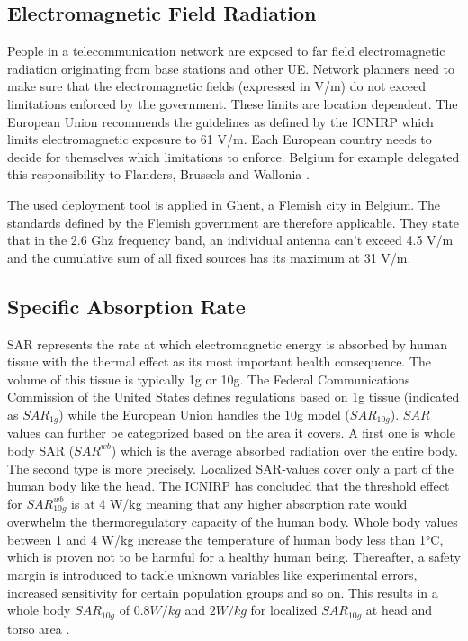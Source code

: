 \subsection{Electromagnetic Field Radiation} %
\label{sub:emf}
People in a telecommunication network are exposed to far field electromagnetic radiation originating from base stations and other \gls{UE}. 
Network planners need to make sure that the electromagnetic fields (expressed in V/m) do not exceed limitations enforced 
by the government. These limits are location dependent. The European Union recommends the guidelines as defined by the \gls{ICNIRP} which limits electromagnetic exposure to 61 V/m.
Each European country needs to decide for themselves which limitations to enforce. Belgium for example delegated this responsibility to Flanders, Brussels and Wallonia \cite{J23}.

The used deployment tool is applied in Ghent, a Flemish city in Belgium. The standards defined by the Flemish government are therefore applicable.
They state that in the 2.6 Ghz frequency band, an individual antenna can't exceed 4.5 V/m and the cumulative sum of all fixed sources has its maximum at 31 V/m.

\subsection{Specific Absorption Rate}
\gls{SAR} represents the rate at which electromagnetic energy is absorbed by human tissue with the thermal effect as its most important health consequence.
The volume of this tissue is typically 1g or 10g. The Federal Communications Commission of the United States defines regulations based on 1g tissue (indicated as $SAR_{1g}$) 
while the European Union handles the 
10g model ($SAR_{10g}$). $SAR$ values can further be categorized based on the area it covers. 
A first one is whole body \gls{SAR} ($SAR^{wb}$) which is the average absorbed radiation over the entire 
body. The second type is more precisely. Localized \gls{SAR}-values cover only  a part of the human body like the head.
The \gls{ICNIRP} has concluded that the threshold effect for $SAR^{wb}_{10g}$ is at 4 W/kg meaning that any higher absorption rate would overwhelm the \gls{thermoregulatory capacity} of the human body.
Whole body values between 1 and 4 W/kg increase the temperature of human body less than 1°C, which is proven not to be harmful for a healthy human being\cite{J24}.
Thereafter, a safety margin is introduced to tackle unknown variables like experimental errors, increased sensitivity for certain population groups and so on. 
This results in a whole body $SAR_{10g}$ of $0.8 W/kg$ and $2 W/kg$ for localized $SAR_{10g}$ at head and torso area \cite{J23}.

